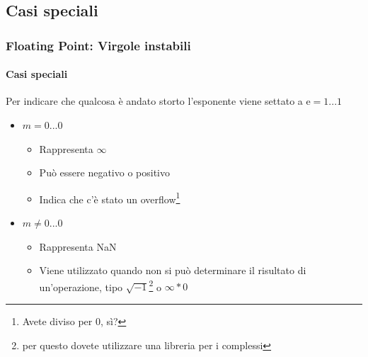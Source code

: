 \documentclass{beamer}
\begin{document}
	  \subsection{Casi speciali}
	  \begin{frame}
	    \frametitle{Floating Point: Virgole instabili}
	    \framesubtitle{Casi speciali}
	    Per indicare che qualcosa è andato storto l'esponente viene settato a $\text{e} = 1\text{...}1$
	    
	    \begin{itemize}
	      \item $m = 0\text{...}0$
	      		\begin{itemize}
	      			\item Rappresenta $\infty$
	      			\item Può essere negativo o positivo
	      			\item Indica che c'è stato un overflow\footnote{Avete diviso per 0, sì?}
	      		\end{itemize}
	      	\item $m \neq 0\text{...}0$
	      		\begin{itemize}
	      			\item Rappresenta NaN
	      			\item Viene utilizzato quando non si può determinare il risultato di un'operazione, tipo $\sqrt{-1}$\footnote{per
	      				questo dovete utilizzare una libreria per i complessi} o $\infty * 0$
	      		\end{itemize}
	    \end{itemize}
	  \end{frame}
\end{document}
